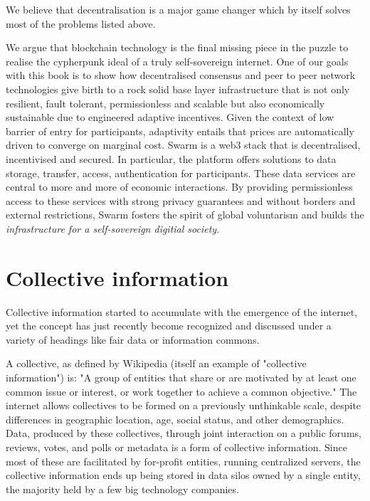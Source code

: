 We believe that decentralisation is a major game changer which by itself solves most of the problems listed above.

We argue that blockchain technology is the final missing piece in the puzzle to realise the cypherpunk ideal of a truly self-sovereign internet. One of our goals with this book is to show how  decentralised consensus and peer to peer network technologies give birth to a rock solid base layer infrastructure that is not only resilient, fault tolerant, permissionless and scalable but also economically sustainable due to engineered adaptive incentives. Given the context of low barrier of entry for participants, adaptivity entails that prices are automatically driven to converge on marginal cost.
Swarm is a web3 stack that is decentralised, incentivised and secured. In particular, the platform offers solutions to data storage, transfer, access, authentication for participants. These data services are central to more and more of economic interactions. By providing permissionless access to these services with strong privacy guarantees and without borders and external restrictions, Swarm fosters the spirit of global voluntarism and builds the \emph{infrastructure for a self-sovereign digitial society}.

\section{Collective information}\label{sec:collective_information}

Collective information started to accumulate with the emergence of the internet, yet the concept has just recently become recognized and discussed under a variety of headings like fair data or information commons. 

A collective, as defined by Wikipedia (itself an example of "collective information") is:
"A group of entities that share or are motivated by at least one common issue or interest, or work together to achieve a common objective." The internet allows collectives to be formed on a previously unthinkable scale, despite differences in geographic location, age, social status, and other demographics. Data,  produced by these collectives, through joint interaction on a public forums, reviews, votes, and polls or metadata is a form of collective information. Since most of these are facilitated by for-profit entities, running centralized servers, the collective information ends up being stored in data silos owned by a single entity, the majority held by a few big technology companies.

